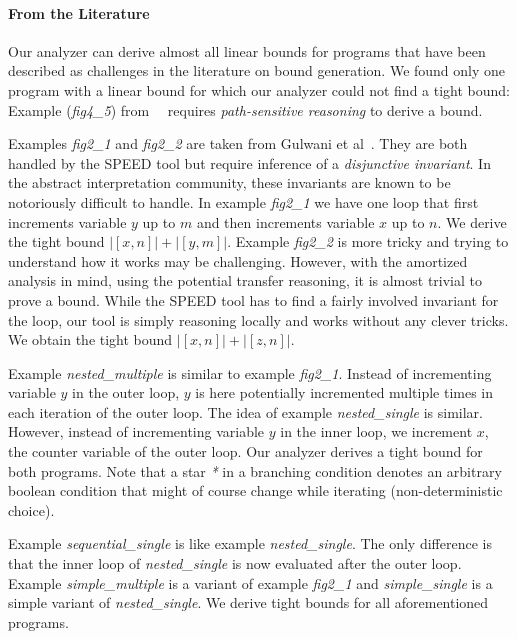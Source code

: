 \documentclass[nocopyrightspace,preprint,pldi]{sigplanconf-pldi15}
\begin{document}
{\paragraph{From  the Literature}

Our analyzer can derive almost all linear bounds for programs that
have been described as challenges in the literature on bound
generation.  We found only one program with a linear bound for
which our analyzer could not find a tight bound:  Example
(\emph{fig4\_5}) from~~\cite{GulwaniJK09} requires \emph{path-sensitive
  reasoning} to derive a bound.

Examples \emph{fig2\_1} and \emph{fig2\_2} are taken from Gulwani et
al~\cite{GulwaniMC09}.  They are both handled by the SPEED tool but
require inference of a \emph{disjunctive invariant}.  In the abstract
interpretation community, these invariants are known to be notoriously
difficult to handle.
%
In example \emph{fig2\_1} we have one loop that first increments
variable $y$ up to $m$ and then increments variable $x$ up to $n$.  We
derive the tight bound $|[x, n]| + |[y, m]|$.
%
Example \emph{fig2\_2} is more tricky and trying to understand how it
works may be challenging.  However, with the amortized analysis in
mind, using the potential transfer reasoning, it is almost trivial to
prove a bound.  While the SPEED tool has to find a fairly
involved invariant for the loop, our tool is simply reasoning locally
and works without any clever tricks. We obtain the tight bound $|[x,
n]| + |[z, n]|$.

Example \emph{nested\_multiple} is similar to example \emph{fig2\_1}.
Instead of incrementing variable $y$ in the outer loop, $y$ is here
potentially incremented multiple times in each iteration of the outer
loop.  The idea of example \emph{nested\_single} is similar.  However,
instead of incrementing variable $y$ in the inner loop, we increment
$x$, the counter variable of the outer loop. Our analyzer derives a
tight bound for both programs.  Note that a star \emph{*} in a
branching condition denotes an arbitrary boolean condition that might
of course change while iterating (non-deterministic choice).

Example \emph{sequential\_single} is like example
\emph{nested\_single}.  The only difference is that the inner loop of
\emph{nested\_single} is now evaluated after the outer loop.  Example
\emph{simple\_multiple} is a variant of example \emph{fig2\_1} and
\emph{simple\_single} is a simple variant of \emph{nested\_single}.
We derive tight bounds for all aforementioned programs.

}
\end{document}
